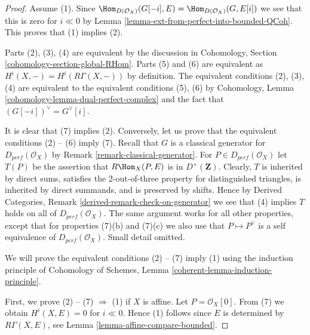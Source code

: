 \begin{proof}
Assume (1). Since
$\Hom_{D(\mathcal{O}_X)}(G[-i], E) = \Hom_{D(\mathcal{O}_X)}(G, E[i])$
we see that this is zero for $i \ll 0$ by
Lemma \ref{lemma-ext-from-perfect-into-bounded-QCoh}. This proves
that (1) implies (2).

\medskip\noindent
Parts (2), (3), (4) are equivalent by the discussion in
Cohomology, Section \ref{cohomology-section-global-RHom}.
Parts (5) and (6) are equivalent as $H^i(X, -) = H^i(R\Gamma(X, -))$
by definition. The equivalent conditions (2), (3), (4) are
equivalent to the equivalent conditions (5), (6) by
Cohomology, Lemma \ref{cohomology-lemma-dual-perfect-complex}
and the fact that $(G[-i])^\vee = G^\vee[i]$.

\medskip\noindent
It is clear that (7) implies (2). Conversely, 
let us prove that the equivalent conditions (2) -- (6) imply (7).
Recall that $G$ is a  classical generator for $D_{perf}(\mathcal{O}_X)$ by
Remark \ref{remark-classical-generator}.
For $P \in D_{perf}(\mathcal{O}_X)$ let $T(P)$ be the assertion that
$R\Hom_X(P, E)$ is in $D^+(\mathbf{Z})$.
Clearly, $T$ is inherited by direct sums,
satisfies the 2-out-of-three property for distinguished
triangles, is inherited by direct summands, and is preserved by shifts.
Hence by Derived Categories, Remark \ref{derived-remark-check-on-generator}
we see that (4) implies $T$ holds on all of $D_{perf}(\mathcal{O}_X)$.
The same argument works for all other properties, except that for properties
(7)(b) and (7)(c) we also use that $P \mapsto P^\vee$ is a self
equivalence of $D_{perf}(\mathcal{O}_X)$. Small detail omitted.

\medskip\noindent
We will prove the equivalent conditions (2) -- (7) imply (1)
using the induction principle of
Cohomology of Schemes, Lemma \ref{coherent-lemma-induction-principle}.

\medskip\noindent
First, we prove (2) -- (7) $\Rightarrow$ (1) if $X$ is affine.
Let $P = \mathcal{O}_X[0]$. From (7) we obtain $H^i (X, E) = 0$
for $i \ll 0$. Hence (1) follows since $E$ is
determined by $R\Gamma (X, E)$, see Lemma \ref{lemma-affine-compare-bounded}.


\end{proof}
